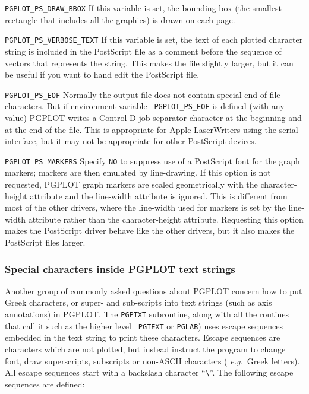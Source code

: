 \documentclass[twoside,11pt]{article}
\begin{document}
\begin{description}
\item{{\tt PGPLOT\_PS\_DRAW\_BBOX}} If this variable is set, the
bounding box (the smallest rectangle that includes all the graphics)
is drawn on each page.

\item{{\tt PGPLOT\_PS\_VERBOSE\_TEXT}} If this variable is set, the
text of each plotted character string is included in the PostScript
file as a comment before the sequence of vectors that represents the
string. This makes the file slightly larger, but it can be useful if
you want to hand edit the PostScript file.

\item{{\tt PGPLOT\_PS\_EOF}} Normally the output file does not contain
special end-of-file characters. But if environment variable {\tt
PGPLOT\_PS\_EOF} is defined (with any value) PGPLOT writes a Control-D
job-separator character at the beginning and at the end of the file.
This is appropriate for Apple LaserWriters using the serial interface,
but it may not be appropriate for other PostScript devices.

\item{{\tt PGPLOT\_PS\_MARKERS}} Specify {\tt NO} to suppress use of a
PostScript font for the graph markers; markers are then emulated by
line-drawing. If this option is not requested, PGPLOT graph markers
are scaled geometrically with the character-height attribute and the
line-width attribute is ignored. This is different from most of the
other drivers, where the line-width used for markers is set by the
line-width attribute rather than the character-height attribute.
Requesting this option makes the PostScript driver behave like the
other drivers, but it also makes the PostScript files larger.

\end{description}

\subsubsection{Special characters inside PGPLOT text strings}

Another group of commonly asked questions about PGPLOT concern how to
put Greek characters, or super- and sub-scripts into text strings
(such as axis annotations) in PGPLOT. The {\tt PGPTXT} subroutine,
along with all the routines that call it such as the higher level {\tt
PGTEXT} or {\tt PGLAB}) uses escape sequences embedded in the text
string to print these characters. Escape sequences are characters
which are not plotted, but instead instruct the program to change
font, draw superscripts, subscripts or non-ASCII characters ({\em
e.g.\ }Greek letters). All escape sequences start with a backslash
character ``\verb*|\|''. The following escape sequences are defined:
\end{document}
